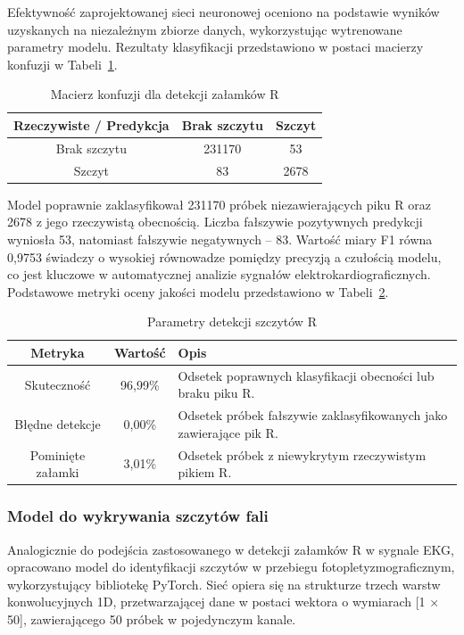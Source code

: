 \documentclass[journal]{IEEEtran}
\begin{document}
Efektywność zaprojektowanej sieci neuronowej oceniono na podstawie wyników uzyskanych na niezależnym zbiorze danych, wykorzystując wytrenowane parametry modelu. Rezultaty klasyfikacji przedstawiono w postaci macierzy konfuzji w Tabeli~\ref{tab:conf_matrix}.

\begin{table}[ht]
\centering
\caption{Macierz konfuzji dla detekcji załamków R}
\label{tab:conf_matrix}
\begin{tabular}{|c|c|c|}
\hline
\textbf{Rzeczywiste / Predykcja} & \textbf{Brak szczytu } & \textbf{Szczyt } \\
\hline
Brak szczytu  & 231170 & 53 \\
\hline
Szczyt  & 83 & 2678 \\
\hline
\end{tabular}
\end{table}

\newpage
Model poprawnie zaklasyfikował 231170 próbek niezawierających piku R oraz 2678 z jego rzeczywistą obecnością. Liczba fałszywie pozytywnych predykcji wyniosła 53, natomiast fałszywie negatywnych -- 83. Wartość miary F1 równa 0,9753 świadczy o wysokiej równowadze pomiędzy precyzją a czułością modelu, co jest kluczowe w automatycznej analizie sygnałów elektrokardiograficznych. Podstawowe metryki oceny jakości modelu przedstawiono w Tabeli~\ref{tab:metrics}.

\begin{table}[ht]
\centering
\caption{Parametry detekcji szczytów R}
\label{tab:metrics}
\begin{tabular}{|c|c|p{4.6cm}|}
\hline
\textbf{Metryka} & \textbf{Wartość} & \textbf{Opis} \\
\hline
Skuteczność & 96,99\% & Odsetek poprawnych klasyfikacji obecności lub braku piku R. \\
\hline
Błędne detekcje & 0,00\% & Odsetek próbek fałszywie zaklasyfikowanych jako zawierające pik R. \\
\hline
Pominięte załamki & 3,01\% & Odsetek próbek z niewykrytym rzeczywistym pikiem R. \\
\hline
\end{tabular}
\end{table}

\subsubsection{Model do wykrywania szczytów fali}
Analogicznie do podejścia zastosowanego w detekcji załamków R w sygnale EKG, opracowano model do identyfikacji szczytów w przebiegu fotopletyzmograficznym, wykorzystujący bibliotekę PyTorch. Sieć opiera się na strukturze trzech warstw konwolucyjnych 1D, przetwarzającej dane w postaci wektora o wymiarach [1 × 50], zawierającego 50 próbek w pojedynczym kanale.
\end{document}
